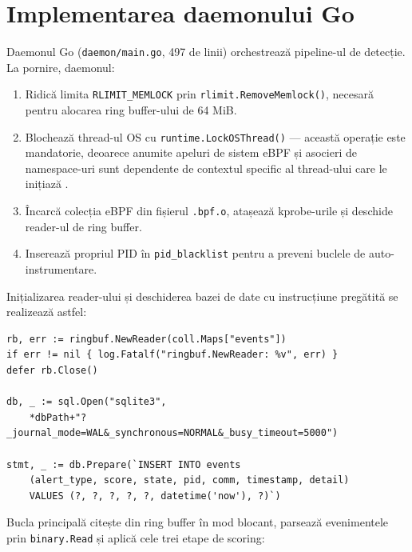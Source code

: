 \section{Implementarea daemonului Go}
\label{sec:daemon_impl}

\par Daemonul Go (\texttt{daemon/main.go}, 497 de linii) orchestrează pipeline-ul de detecție. La pornire, daemonul:

\begin{enumerate}
    \item Ridică limita \texttt{RLIMIT\_MEMLOCK} prin \texttt{rlimit.RemoveMemlock()}, necesară pentru alocarea ring buffer-ului de 64 MiB.
    \item Blochează thread-ul OS cu \texttt{runtime.LockOSThread()} --- această operație este mandatorie, deoarece anumite apeluri de sistem eBPF și asocieri de namespace-uri sunt dependente de contextul specific al thread-ului care le inițiază \cite{CiliumEBPF}.
    \item Încarcă colecția eBPF din fișierul \texttt{.bpf.o}, atașează kprobe-urile și deschide reader-ul de ring buffer.
    \item Inserează propriul PID în \texttt{pid\_blacklist} pentru a preveni buclele de auto-instrumentare.
\end{enumerate}

\par Inițializarea reader-ului și deschiderea bazei de date cu instrucțiune pregătită se realizează astfel:

\begin{lstlisting}[style=gostyle,caption={Inițializarea ring buffer reader și a instrcțiunii de inserție SQLite}]
rb, err := ringbuf.NewReader(coll.Maps["events"])
if err != nil { log.Fatalf("ringbuf.NewReader: %v", err) }
defer rb.Close()

db, _ := sql.Open("sqlite3",
    *dbPath+"?_journal_mode=WAL&_synchronous=NORMAL&_busy_timeout=5000")

stmt, _ := db.Prepare(`INSERT INTO events
    (alert_type, score, state, pid, comm, timestamp, detail)
    VALUES (?, ?, ?, ?, ?, datetime('now'), ?)`)
\end{lstlisting}

\par Bucla principală citește din ring buffer în mod blocant, parsează evenimentele prin \texttt{binary.Read} și aplică cele trei etape de scoring:

